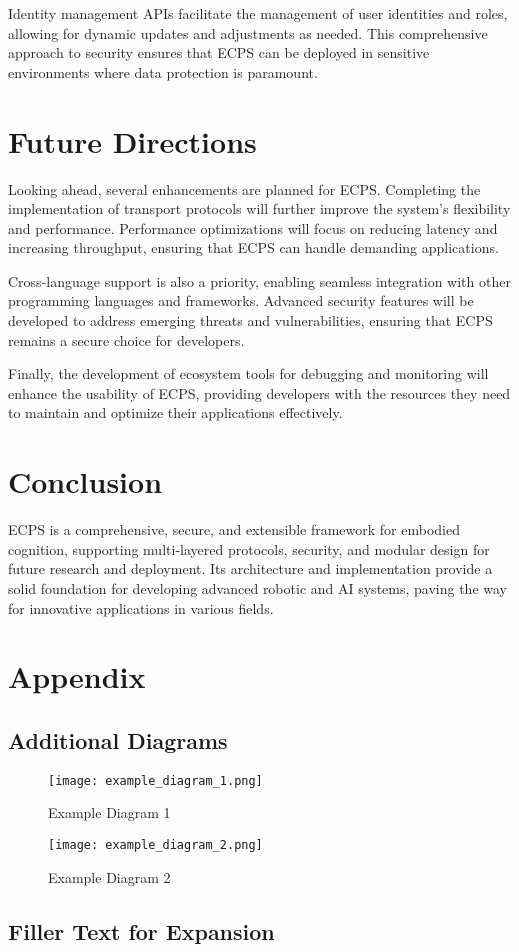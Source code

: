 \documentclass[12pt]{article}
\begin{document}
Identity management APIs facilitate the management of user identities and roles, allowing for dynamic updates and adjustments as needed. This comprehensive approach to security ensures that ECPS can be deployed in sensitive environments where data protection is paramount.

\section{Future Directions}
Looking ahead, several enhancements are planned for ECPS. Completing the implementation of transport protocols will further improve the system's flexibility and performance. Performance optimizations will focus on reducing latency and increasing throughput, ensuring that ECPS can handle demanding applications.

Cross-language support is also a priority, enabling seamless integration with other programming languages and frameworks. Advanced security features will be developed to address emerging threats and vulnerabilities, ensuring that ECPS remains a secure choice for developers.

Finally, the development of ecosystem tools for debugging and monitoring will enhance the usability of ECPS, providing developers with the resources they need to maintain and optimize their applications effectively.

\section{Conclusion}
ECPS is a comprehensive, secure, and extensible framework for embodied cognition, supporting multi-layered protocols, security, and modular design for future research and deployment. Its architecture and implementation provide a solid foundation for developing advanced robotic and AI systems, paving the way for innovative applications in various fields.

\newpage
\section{Appendix}
\subsection{Additional Diagrams}
\begin{figure}[H]
\centering
\texttt{[image: example\_diagram\_1.png]}
\caption{Example Diagram 1}
\end{figure}

\begin{figure}[H]
\centering
\texttt{[image: example\_diagram\_2.png]}
\caption{Example Diagram 2}
\end{figure}

\subsection{Filler Text for Expansion}
\lipsum[1-20] %
\end{document}
